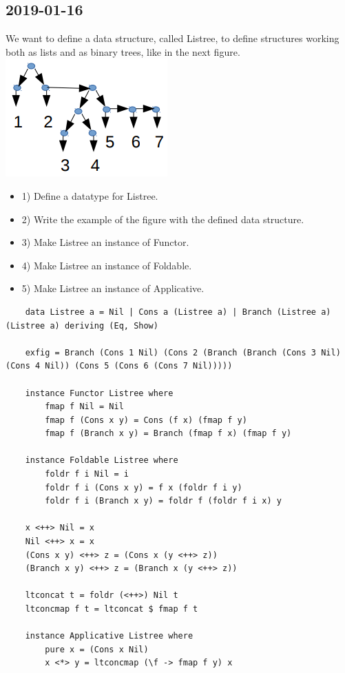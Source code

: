  
\subsection{2019-01-16}
We want to define a data structure, called Listree, to define structures working both as lists and as binary
trees, like in the next figure.
\includegraphics{haskell/2019-02-08.png}
\begin{itemize}
    \item 1) Define a datatype for Listree.
    \item 2) Write the example of the figure with the defined data structure.
    \item 3) Make Listree an instance of Functor.
    \item 4) Make Listree an instance of Foldable.
    \item 5) Make Listree an instance of Applicative.
\end{itemize}
\begin{lstlisting}
    data Listree a = Nil | Cons a (Listree a) | Branch (Listree a)(Listree a) deriving (Eq, Show)

    exfig = Branch (Cons 1 Nil) (Cons 2 (Branch (Branch (Cons 3 Nil) (Cons 4 Nil)) (Cons 5 (Cons 6 (Cons 7 Nil)))))

    instance Functor Listree where
        fmap f Nil = Nil
        fmap f (Cons x y) = Cons (f x) (fmap f y)
        fmap f (Branch x y) = Branch (fmap f x) (fmap f y)

    instance Foldable Listree where
        foldr f i Nil = i
        foldr f i (Cons x y) = f x (foldr f i y)
        foldr f i (Branch x y) = foldr f (foldr f i x) y

    x <++> Nil = x
    Nil <++> x = x
    (Cons x y) <++> z = (Cons x (y <++> z))
    (Branch x y) <++> z = (Branch x (y <++> z))

    ltconcat t = foldr (<++>) Nil t
    ltconcmap f t = ltconcat $ fmap f t

    instance Applicative Listree where
        pure x = (Cons x Nil)
        x <*> y = ltconcmap (\f -> fmap f y) x
\end{lstlisting}